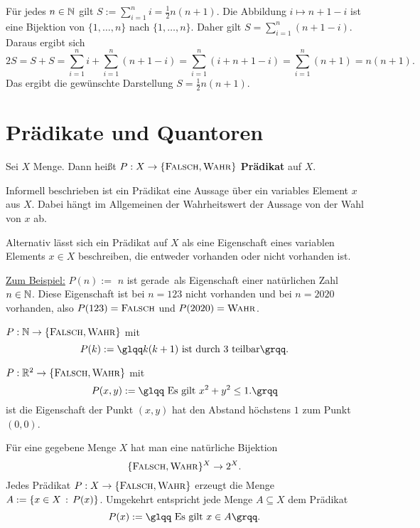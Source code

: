 \begin{bsp}
	Für jedes $n \in \mathbb{N}$ gilt $S:=\sum\limits_{i=1}^n i = \frac{1}{2} n (n+1).$ Die Abbildung $i \mapsto n+1 - i$ ist eine Bijektion von $\{1,\ldots,n\}$ nach $\{1,\ldots,n\}$. Daher gilt  $S = \sum\limits_{i=1}^n (n+1 - i)$. Daraus ergibt sich 
	\[
		2 S = S +  S = \sum_{i=1}^n i + \sum_{i=1}^n (n+1 - i) = \sum_{i=1}^n ( i + n + 1 -i) = \sum_{i=1}^n (n+1) = n (n+1). 
	\]
	Das ergibt die gewünschte Darstellung $S = \frac{1}{2} n (n+1)$. 
\end{bsp} 




\section{Prädikate und Quantoren}


\begin{defn}
Sei $ X $ Menge. Dann heißt $ P : X \to \{ \mathop{\text{\textsc{Falsch}}},\mathop{\text{\textsc{Wahr}}} \} $ \textbf{Prädikat} auf $ X $. 
\end{defn} 

\begin{bem}
	Informell beschrieben ist ein Prädikat eine Aussage über ein variables Element $x$ aus $X$. Dabei hängt im Allgemeinen der Wahrheitswert der Aussage von der Wahl von $x$ ab.
	
	Alternativ lässt sich ein Prädikat auf $X$ als eine Eigenschaft eines variablen Elements $x \in X$ beschreiben, die entweder vorhanden oder nicht vorhanden ist.
	
	\underline{Zum Beispiel:} $P(n):=$ \glqq$n$ ist gerade\grqq\ als Eigenschaft einer natürlichen Zahl $n \in \mathbb{N}$. Diese Eigenschaft ist bei $n=123$ nicht vorhanden und bei $n=2020$ vorhanden, also $P(123) = \mathop{\text{\textsc{Falsch}}}$ und $P(2020) = \mathop{\text{\textsc{Wahr}}}$.
\end{bem}

\begin{bsp}
$ P : \mathbb{N} \to \{ \mathop{\text{\textsc{Falsch}}},\mathop{\text{\textsc{Wahr}}} \}$ mit 
\[
	P(k) :=  \text{\glqq$k(k+1)$ ist durch  $ 3$  teilbar\grqq}. 
\]
\end{bsp} 

\begin{bsp}
$ P : \mathbb{R}^2 \to \{ \mathop{\text{\textsc{Falsch}}} , \mathop{\text{\textsc{Wahr}}} \}$ mit 
\[
	P(x,y) := \text{\glqq Es gilt $x^2 + y^2 \le 1$.\grqq}
\] 
ist die Eigenschaft \glqq der Punkt $(x,y)$ hat den Abstand höchstens $1$ zum Punkt $(0,0)$\grqq. 
\end{bsp} 

\begin{bem} 
	Für eine gegebene Menge $X$ hat man eine natürliche Bijektion 
	\[
		 \{ \mathop{\text{\textsc{Falsch}}},\mathop{\text{\textsc{Wahr}}} \}^X \to 2^X.
	\] 
	Jedes Prädikat $P : X \to \{ \mathop{\text{\textsc{Falsch}}},\mathop{\text{\textsc{Wahr}}} \}$ erzeugt die Menge $A:=\left\{ x \in X  \,:\, P(x) \right\}$. Umgekehrt entspricht jede Menge $A \subseteq X$ dem Prädikat 
	\[
		P (x) := \text{\glqq Es gilt $x \in A$\grqq}. 
	\]
\end{bem} 



